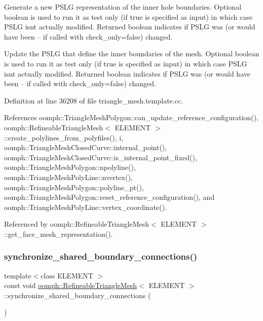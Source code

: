 Generate a new P\+S\+LG representation of the inner hole boundaries. Optional boolean is used to run it as test only (if true is specified as input) in which case P\+S\+LG isn\textquotesingle{}t actually modified. Returned boolean indicates if P\+S\+LG was (or would have been -- if called with check\+\_\+only=false) changed. 

Update the P\+S\+LG that define the inner boundaries of the mesh. Optional boolean is used to run it as test only (if true is specified as input) in which case P\+S\+LG isn\textquotesingle{}t actually modified. Returned boolean indicates if P\+S\+LG was (or would have been -- if called with check\+\_\+only=false) changed. 

Definition at line 36208 of file triangle\+\_\+mesh.\+template.\+cc.



References oomph\+::\+Triangle\+Mesh\+Polygon\+::can\+\_\+update\+\_\+reference\+\_\+configuration(), oomph\+::\+Refineable\+Triangle\+Mesh$<$ E\+L\+E\+M\+E\+N\+T $>$\+::create\+\_\+polylines\+\_\+from\+\_\+polyfiles(), i, oomph\+::\+Triangle\+Mesh\+Closed\+Curve\+::internal\+\_\+point(), oomph\+::\+Triangle\+Mesh\+Closed\+Curve\+::is\+\_\+internal\+\_\+point\+\_\+fixed(), oomph\+::\+Triangle\+Mesh\+Polygon\+::npolyline(), oomph\+::\+Triangle\+Mesh\+Poly\+Line\+::nvertex(), oomph\+::\+Triangle\+Mesh\+Polygon\+::polyline\+\_\+pt(), oomph\+::\+Triangle\+Mesh\+Polygon\+::reset\+\_\+reference\+\_\+configuration(), and oomph\+::\+Triangle\+Mesh\+Poly\+Line\+::vertex\+\_\+coordinate().



Referenced by oomph\+::\+Refineable\+Triangle\+Mesh$<$ E\+L\+E\+M\+E\+N\+T $>$\+::get\+\_\+face\+\_\+mesh\+\_\+representation().

\mbox{\label{classoomph_1_1RefineableTriangleMesh_ad9966aa29b0174bdddf6b1584a03f59f}} 
\subsubsection{\texorpdfstring{synchronize\+\_\+shared\+\_\+boundary\+\_\+connections()}{synchronize\_shared\_boundary\_connections()}}
{\footnotesize\ttfamily template$<$class E\+L\+E\+M\+E\+NT $>$ \\
const void \hyperlink{classoomph_1_1RefineableTriangleMesh}{oomph\+::\+Refineable\+Triangle\+Mesh}$<$ E\+L\+E\+M\+E\+NT $>$\+::synchronize\+\_\+shared\+\_\+boundary\+\_\+connections (\begin{DoxyParamCaption}{ }\end{DoxyParamCaption})\hspace{0.3cm}{\ttfamily [protected]}}



